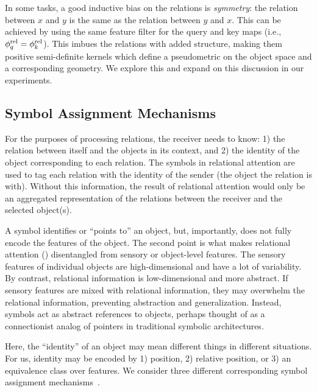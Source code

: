 In some tasks, a good inductive bias on the relations is \textit{symmetry}: the relation between $x$ and $y$ is the same as the relation between $y$ and $x$. This can be achieved by using the same feature filter for the query and key maps (i.e., $\phi_q^{\mathrm{rel}} = \phi_k^{\mathrm{rel}}$). This imbues the relations with added structure, making them positive semi-definite kernels which define a pseudometric on the object space and a corresponding geometry. We explore this and expand on this discussion in our experiments.

\subsection{Symbol Assignment Mechanisms}

For the purposes of processing relations, the receiver needs to know: 1) the relation between itself and the objects in its context, and 2) the identity of the object corresponding to each relation.
The symbols in relational attention are used to tag each relation with the identity of the sender (the object the relation is with). Without this information, the result of relational attention would only be an aggregated representation of the relations between the receiver and the selected object(s).


A symbol identifies or ``points to'' an object, but, importantly, does not fully encode the features of the object. The second point is what makes relational attention () disentangled from sensory or object-level features. The sensory features of individual objects are high-dimensional and have a lot of variability. By contrast, relational information is low-dimensional and more abstract. If sensory features are mixed with relational information, they may overwhelm the relational information, preventing abstraction and generalization. Instead, symbols act as abstract references to objects, perhaps thought of as a connectionist analog of pointers in traditional symbolic architectures.

Here, the ``identity'' of an object may mean different things in different situations. For us, identity may be encoded by 1) position, 2) relative position, or 3) an equivalence class over features. We consider three different corresponding symbol assignment mechanisms~\citep{altabaa2024abstractors}.

